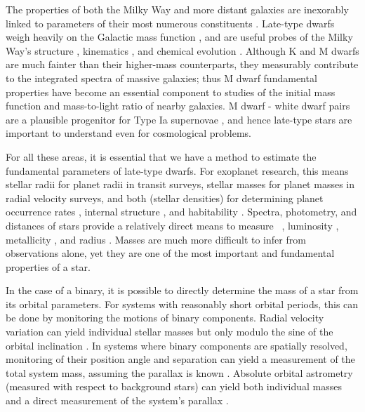 \documentclass[twocolumn]{aastex62}
\begin{document}
The properties of both the Milky Way and more distant galaxies are inexorably linked to parameters of their most numerous constituents \citep[$>$70\% of stars in the Solar neighborhood are M dwarfs,][]{Henry:1994fk,Reid:2004lr}. Late-type dwarfs weigh heavily on the Galactic mass function \citep[e.g.,][]{Covey:2008lr}, and are useful probes of the Milky Way's structure \citep[e.g.,][]{2008ApJ...673..864J,2017ApJ...843..141F}, kinematics \citep[e.g.,][]{2007AJ....134.2418B,2015RAA....15..860Y}, and chemical evolution \citep{Woolf:2012lr,2015AJ....149..140H}. Although K and M dwarfs are much fainter than their higher-mass counterparts, they measurably contribute to the integrated spectra of massive galaxies; thus M dwarf fundamental properties have become an essential component to studies of the initial mass function \citep[e.g.,][]{2012ApJ...747...69C,2016ApJ...821...39M} and mass-to-light ratio \citep{2015MNRAS.452L..21S} of nearby galaxies. M dwarf - white dwarf pairs are a plausible progenitor for Type Ia supernovae \citep{2012ApJ...758..123W}, and hence late-type stars are important to understand even for cosmological problems.

For all these areas, it is essential that we have a method to estimate the fundamental parameters of late-type dwarfs. For exoplanet research, this means stellar radii for planet radii in transit surveys, stellar masses for planet masses in radial velocity surveys, and both (stellar densities) for determining planet occurrence rates \citep[e.g.,][]{2010exop.book...55W,Gaidos2013}, internal structure \citep[e.g.,][]{Rogers:2011lr}, and habitability \citep[e.g.,][]{Gaidos2013a,Kane2017}. Spectra, photometry, and distances of stars provide a relatively direct means to measure \teff\ \citep[e.g.,][]{Rojas-Ayala:2012uq,Mann2013c}, luminosity \citep[e.g.,][]{2002AJ....124.2721R}, metallicity \citep[e.g.,][]{Bonfils:2005,RojasAyala:2010}, and radius \citep[e.g., via Stefan-Boltzmann, ][]{Newton2015A,Kesseli:2018aa}. Masses are much more difficult to infer from observations alone, yet they are one of the most important and fundamental properties of a star.  

In the case of a binary, it is possible to directly determine the mass of a star from its orbital parameters. For systems with reasonably short orbital periods, this can be done by monitoring the motions of binary components.  Radial velocity variation can yield individual stellar masses but only modulo the sine of the orbital inclination \citep[e.g.,][]{Torres2002,Kraus2011,Stevens:2018aa}. In systems where binary components are spatially resolved, monitoring of their position angle and separation can yield a measurement of the total system mass, assuming the parallax is known \citep[e.g.,][]{Soderhjelm1999,Woi2003,2009ApJ...699..168D}. Absolute orbital astrometry (measured with respect to background stars) can yield both individual masses and a direct measurement of the system's parallax \citep[e.g.,][]{Koh2012,Benedict2016}. 
\end{document}
